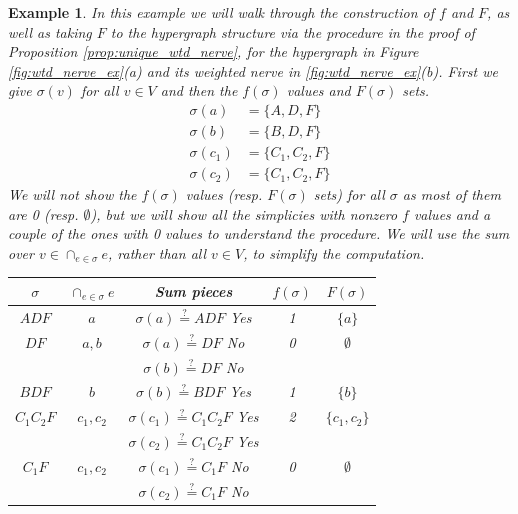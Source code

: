 \documentclass{amsart}
\newtheorem{example}[theorem]{Example}
\begin{document}
\begin{example}\label{ex:wtd_nerve_ex}
In this example we will walk through the construction of $f$ and $F$, as well as taking $F$ to the hypergraph structure via the procedure in the proof of Proposition \ref{prop:unique_wtd_nerve}, for the hypergraph in Figure \ref{fig:wtd_nerve_ex}(a) and its weighted nerve in \ref{fig:wtd_nerve_ex}(b). First we give $\sigma(v)$ for all $v \in V$ and then the $f(\sigma)$ values and $F(\sigma)$ sets.
\begin{align*}
    \sigma(a) &= \{A, D, F\}\\
    \sigma(b) &= \{B, D, F\}\\
    \sigma(c_1) &= \{C_1, C_2, F\}\\
    \sigma(c_2) &= \{C_1, C_2, F\}
\end{align*}
We will not show the $f(\sigma)$ values (resp. $F(\sigma)$ sets) for all $\sigma$ as most of them are 0 (resp. $\emptyset$), but we will show all the simplicies with nonzero $f$ values and a couple of the ones with 0 values to understand the procedure. We will use the sum over $v \in \cap_{e \in \sigma} e$, rather than all $v\in V$, to simplify the computation.
\vspace{1em}
\begin{center}
\begin{tabular}{ccccc}
$\sigma$ & $\cap_{e \in \sigma} e$ & Sum pieces & $f(\sigma)$ & $F(\sigma)$\\\hline\hline
$ADF$ & $a$    & $\sigma(a) \stackrel{?}{=} ADF$ Yes & 1 & $\{a\}$\\\hline
$DF$  & $a, b$ & $\sigma(a) \stackrel{?}{=} DF$ No & 0 & $\emptyset$\\
      &        & $\sigma(b) \stackrel{?}{=} DF$ No &   & \\\hline
$BDF$ & $b$    & $\sigma(b) \stackrel{?}{=} BDF$ Yes & 1 & $\{b\}$\\\hline
$C_1C_2F$ & $c_1, c_2$ & $\sigma(c_1) \stackrel{?}{=} C_1C_2F$ Yes & 2 & $\{c_1, c_2\}$\\
          &            & $\sigma(c_2) \stackrel{?}{=} C_1C_2F$ Yes &  &  \\\hline
$C_1F$ & $c_1, c_2$ & $\sigma(c_1) \stackrel{?}{=} C_1F$ No & 0 & $\emptyset$\\
          &         & $\sigma(c_2) \stackrel{?}{=} C_1F$ No &   & \\\hline
\end{tabular}
\end{center}
\vspace{1em}


\end{example}
\end{document}
